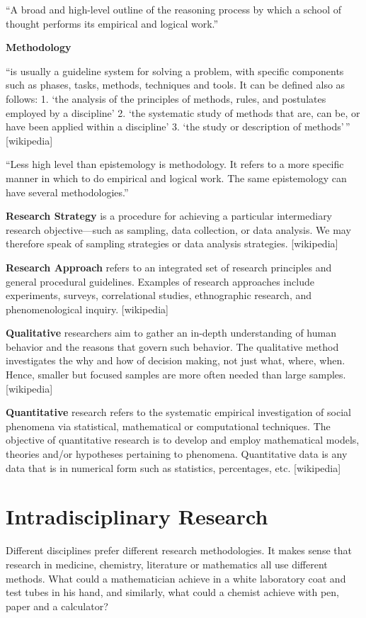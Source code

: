 ``A broad and high-level outline of the reasoning process by which a school of thought performs its empirical and logical work.'' \autocite{Mingers2004}

\textbf{Methodology}

``is usually a guideline system for solving a problem, with specific components such as phases, tasks, methods, techniques and tools. It can be defined also as follows: 1.	`the analysis of the principles of methods, rules, and postulates employed by a discipline' 2.	`the systematic study of methods that are, can be, or have been applied within a discipline' 3.	`the study or description of methods'\,'' [wikipedia]

``Less high level than epistemology is methodology. It refers to a more specific manner in which to do empirical and logical work. The same epistemology can have several methodologies.'' \autocite{Mingers2004}

\textbf{Research Strategy}
is a procedure for achieving a particular intermediary research objective—such as sampling, data collection, or data analysis. We may therefore speak of sampling strategies or data analysis strategies. [wikipedia]

\textbf{Research Approach}
refers to an integrated set of research principles and general procedural guidelines. Examples of research approaches include experiments, surveys, correlational studies, ethnographic research, and phenomenological inquiry. [wikipedia]

\textbf{Qualitative}
researchers aim to gather an in-depth understanding of human behavior and the reasons that govern such behavior. The qualitative method investigates the why and how of decision making, not just what, where, when. Hence, smaller but focused samples are more often needed than large samples. [wikipedia]

\textbf{Quantitative}
research refers to the systematic empirical investigation of social phenomena via statistical, mathematical or computational techniques. The objective of quantitative research is to develop and employ mathematical models, theories and/or hypotheses pertaining to phenomena. Quantitative data is any data that is in numerical form such as statistics, percentages, etc. [wikipedia]


\section{Intradisciplinary Research}

Different disciplines prefer different research methodologies. It makes sense that research in medicine, chemistry, literature or mathematics all use different methods. What could a mathematician achieve in a white laboratory coat and test tubes in his hand, and similarly, what could a chemist achieve with pen, paper and a calculator?

